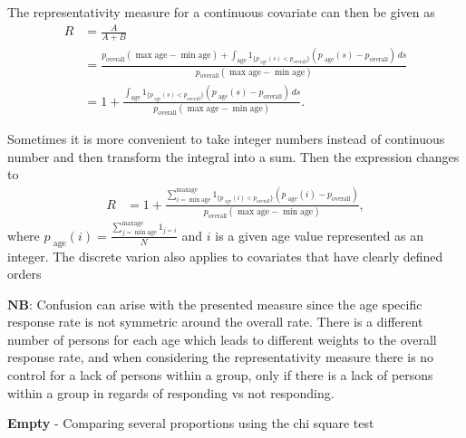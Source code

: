 \documentclass[
]{article}
\begin{document}
\newline

The representativity measure for a continuous covariate can then be
given as \begin{align}
R &= \frac{A}{A+B} \\
&= \frac{p_{\text{overall}} \left( \max \text{age} - \min \text{age} \right) + 
\int_{\text{age}}1_{ \{  p_{\text{ age}}( s) < p_{\text{overall}} \} }\left(p_{\text{ age}}( s) - p_{\text{overall}}  \right)  \, ds}{ p_{\text{overall}} \left( \max \text{age} - \min \text{age} \right)}\\
& = 1+\frac{
\int_{\text{age}}1_{ \{  p_{\text{ age}}( s) < p_{\text{overall}} \} }\left(p_{\text{ age}}( s) - p_{\text{overall}}  \right)  \, ds}{ p_{\text{overall}} \left( \max \text{age} - \min \text{age} \right)}.
\end{align}

\newline

Sometimes it is more convenient to take integer numbers instead of
continuous number and then transform the integral into a sum. Then the
expression changes to \begin{align}

R & = 1 + \frac{\sum_{i = \min \text{age}}^{\max \text{age}} 1_{ \{  p_{\text{ age}}( i) < p_{\text{overall}} \} } \left( p_{\text{ age}}( i) - p_{\text{overall}}  \right)}{p_{\text{overall}} \left( \max \text{age} - \min \text{age} \right)},
\end{align} where
\(p_{\text{ age}}( i) = \frac{ \sum_{j = \min \text{age}}^{\max \text{age}} 1_{ j = i}}{N}\)
and \(i\) is a given age value represented as an integer. The discrete
varion also applies to covariates that have clearly defined orders

\(\textbf{NB:}\) Confusion can arise with the presented measure since
the age specific response rate is not symmetric around the overall rate.
There is a different number of persons for each age which leads to
different weights to the overall response rate, and when considering the
representativity measure there is no control for a lack of persons
within a group, only if there is a lack of persons within a group in
regards of responding vs not responding.

\textbf{Empty} - Comparing several proportions using the chi square test

\newline
\end{document}
